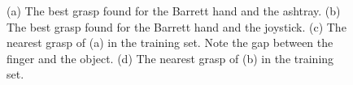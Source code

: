 \begin{figure}
  \centering

 \caption{\scriptsize{(a) The best grasp found for the Barrett hand and the ashtray. (b) The best grasp found for the Barrett hand and the joystick. (c) The nearest grasp of (a) in the training set. Note the gap between the finger and the object. (d) The nearest grasp of (b) in the training set. }
}
    \label{near}
\end{figure}


